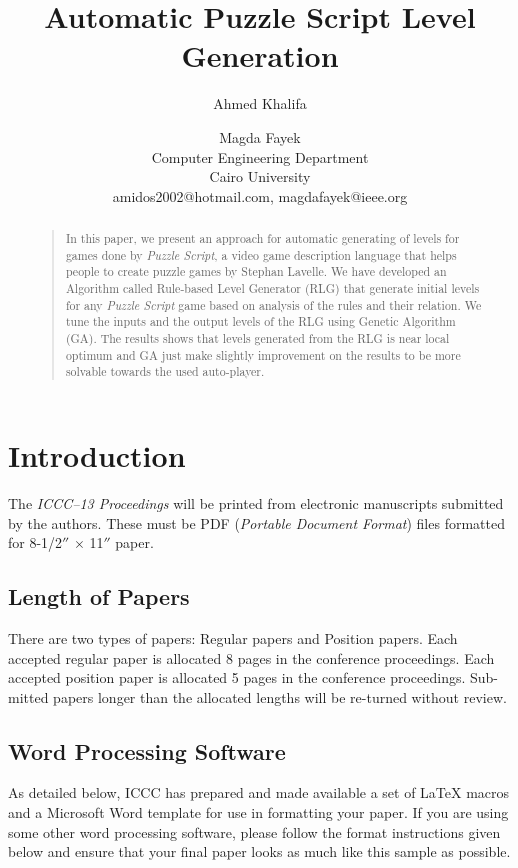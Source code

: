 \documentclass[letterpaper]{article}
\title{Automatic Puzzle Script Level Generation}
\author{Ahmed Khalifa \and Magda Fayek\\
Computer Engineering Department\\
Cairo University\\
amidos2002@hotmail.com, magdafayek@ieee.org\\
}
\begin{document}
 
\maketitle
\begin{abstract}
\begin{quote}
In this paper, we present an approach for automatic generating of levels for games done by \emph{Puzzle Script}, a video game description language that helps people to create puzzle games by Stephan Lavelle\cite{puzzleScript}. We have developed an Algorithm called Rule-based Level Generator (RLG) that generate initial levels for any \emph{Puzzle Script} game based on analysis of the rules and their relation. We tune the inputs and the output levels of the RLG using Genetic Algorithm (GA). The results shows that levels generated from the RLG is near local optimum and GA just make slightly improvement on the results to be more solvable towards the used auto-player.
\end{quote}
\end{abstract}

\section{Introduction}
The {\it ICCC--13 Proceedings} will be printed from electronic
manuscripts submitted by the authors. These must be PDF ({\em Portable
Document Format}) files formatted for 8-1/2$''$ $\times$ 11$''$ paper.

\subsection{Length of Papers}
There are two types of papers: Regular papers and Position papers. Each accepted regular paper is allocated 8 pages in the conference proceedings.  Each accepted position paper is allocated 5 pages in the conference proceedings.  Sub-mitted papers longer than the allocated lengths will be re-turned without review.

\subsection{Word Processing Software}
As detailed below, ICCC has prepared and made available a set of
\LaTeX{} macros and a Microsoft Word template for use in formatting
your paper. If you are using some other word processing software, please follow the format instructions given below and ensure that your final paper looks as much like this sample as possible.
\end{document}
